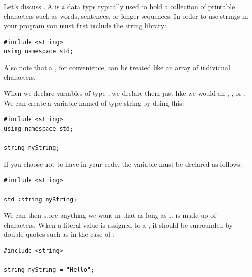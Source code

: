 
Let's discuss .
A  is a data type typically used to hold a collection of printable characters such as words, sentences, or longer sequences.
In order to use strings in your program you must first include the string library:

\noindent\begin{minipage}{\linewidth}\begin{lstlisting}
#include <string>
using namespace std;
\end{lstlisting}\end{minipage}

\noindent Also note that a , for convenience, can be treated like an array of individual characters.

When we declare variables of type , we declare them just like we would an , , or .
We can create a variable named  of type string by doing this:

\noindent\begin{minipage}{\linewidth}\begin{lstlisting}
#include <string>
using namespace std;

string myString;
\end{lstlisting}\end{minipage}

\noindent If you choose not to have  in your code, the variable  must be declared as follows:

\noindent\begin{minipage}{\linewidth}\begin{lstlisting}
#include <string>

std::string myString;
\end{lstlisting}\end{minipage}

\noindent We can then store anything we want in that  as long as it is made up of characters.
When a literal value is assigned to a , it should be surrounded by double quotes such as in the case of :

\noindent\begin{minipage}{\linewidth}\begin{lstlisting}
#include <string>

string myString = "Hello";
\end{lstlisting}\end{minipage}

